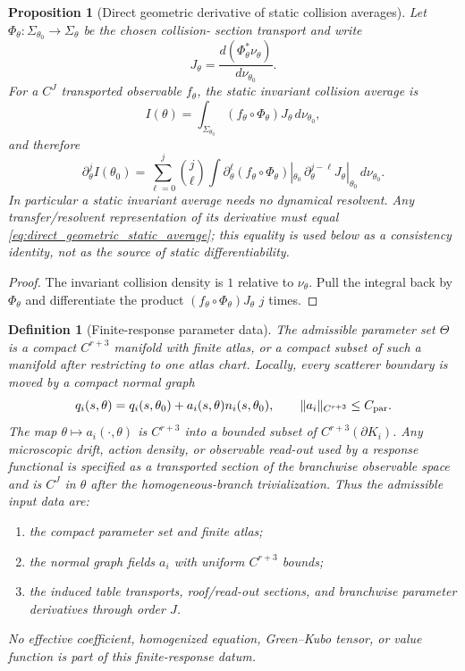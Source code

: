 \documentclass[11pt]{amsart}
\theoremstyle{compactplain}
\newtheorem{proposition}[theorem]{Proposition}
\theoremstyle{compactdefinition}
\newtheorem{definition}[theorem]{Definition}
\theoremstyle{compactremark}
\newcommand{\Thetacal}{\Theta}
\begin{document}
\begin{proposition}[Direct geometric derivative of static collision averages]
\label{prop:direct_geometric_invariant_average}
Let \(\Phi_\theta:\Sigma_{\theta_0}\to\Sigma_\theta\) be the chosen collision-
section transport and write
\[
  J_\theta
  =\frac{d(\Phi_\theta^*\nu_\theta)}{d\nu_{\theta_0}}.
\]
For a \(C^J\) transported observable \(f_\theta\), the static invariant
collision average is
\[
 I(\theta)=\int_{\Sigma_{\theta_0}}
   (f_\theta\circ\Phi_\theta)J_\theta\,d\nu_{\theta_0},
\]
and therefore
\begin{equation}
\label{eq:direct_geometric_static_average}
 \partial_\theta^j I(\theta_0)
 =\sum_{\ell=0}^j\binom j\ell
  \int
  \partial_\theta^\ell(f_\theta\circ\Phi_\theta)|_{\theta_0}
  \,\partial_\theta^{j-\ell}J_\theta|_{\theta_0}
  \,d\nu_{\theta_0}.
\end{equation}
In particular a static invariant average needs no dynamical resolvent.  Any
transfer/resolvent representation of its derivative must equal
\eqref{eq:direct_geometric_static_average}; this equality is used below as a
consistency identity, not as the source of static differentiability.
\end{proposition}

\begin{proof}
The invariant collision density is \(1\) relative to \(\nu_\theta\).  Pull the
integral back by \(\Phi_\theta\) and differentiate the product
\((f_\theta\circ\Phi_\theta)J_\theta\) \(j\) times.
\end{proof}

\begin{definition}[Finite-response parameter data]
\label{def:finite_response_chart}
The admissible parameter set $\Thetacal$ is a compact $C^{r+3}$ manifold with
finite atlas, or a compact subset of such a manifold after restricting to one
atlas chart.  Locally, every scatterer boundary is moved by a compact normal
graph
\begin{equation}
  q_i(s,\theta)=q_i(s,\theta_0)+a_i(s,\theta)n_i(s,\theta_0),
  \qquad \|a_i\|_{C^{r+3}}\le C_{\rm par}.
\end{equation}
The map $\theta\mapsto a_i(\cdot,\theta)$ is $C^{r+3}$ into a bounded subset of
$C^{r+3}(\partial K_i)$.  Any microscopic drift, action density, or observable
read-out used by a response functional is specified as a transported section of
the branchwise observable space and is \(C^J\) in $\theta$ after the
homogeneous-branch trivialization.  Thus the admissible input data are:
\begin{enumerate}[label=\textup{(P\arabic*)},wide,labelindent=0pt]
  \item the compact parameter set and finite atlas;
  \item the normal graph fields $a_i$ with uniform $C^{r+3}$ bounds;
  \item the induced table transports, roof/read-out sections, and branchwise
  parameter derivatives through order \(J\).
\end{enumerate}
No effective coefficient, homogenized equation, Green--Kubo tensor, or value
function is part of this finite-response datum.
\end{definition}
\end{document}
